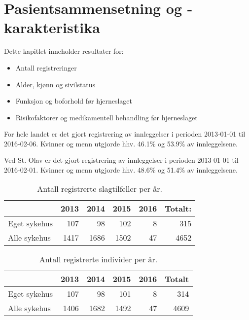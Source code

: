 \documentclass [norsk,a4paper,twoside]{article}\usepackage[]{graphicx}\usepackage[]{color}
\begin{document}
\clearpage
\section{Pasientsammensetning og -karakteristika}

Dette kapitlet inneholder resultater for:
\begin{itemize}
	\item Antall registreringer
	\item Alder, kjønn og sivilstatus
	\item Funksjon og boforhold før hjerneslaget
	\item Risikofaktorer og medikamentell behandling før hjerneslaget 
\end{itemize}


For hele landet er det gjort registrering av innleggelser i perioden 
2013-01-01 til 2016-02-06.
Kvinner og menn utgjorde hhv. 46.1\% og 53.9\% av innleggelsene.


Ved St. Olav er det gjort registrering av innleggelser i perioden 
2013-01-01 til 2016-02-01.
Kvinner og menn utgjorde hhv. 48.6\% og 51.4\% av innleggelsene.


\begin{table}[ht]
\centering
\begin{tabular}{lrrrrr}
  \hline
 & 2013 & 2014 & 2015 & 2016 & Totalt: \\ 
  \hline
Eget sykehus & 107 & 98 & 102 & 8 & 315 \\ 
  Alle sykehus & 1417 & 1686 & 1502 & 47 & 4652 \\ 
   \hline
\end{tabular}
\caption{Antall registrerte slagtilfeller per år.} 
\label{tab:AntRegEget}
\end{table}
\begin{table}[ht]
\centering
\begin{tabular}{lrrrrr}
  \hline
 & 2013 & 2014 & 2015 & 2016 & Totalt \\ 
  \hline
Eget sykehus & 107 & 98 & 101 & 8 & 314 \\ 
  Alle sykehus & 1406 & 1682 & 1492 & 47 & 4609 \\ 
   \hline
\end{tabular}
\caption{Antall registrerte individer per år.} 
\label{tab:AntPasAarEget}
\end{table}
\end{document}
